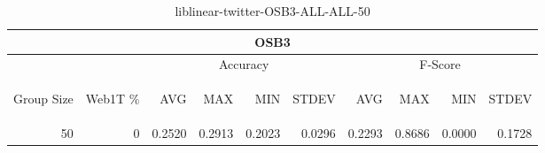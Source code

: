 \begin{center}
\begin{table}[htbp]
\begin{tabular}{ | r | r | r | r | r | r | r | r | r | r |}
\hline
\multicolumn{10}{|c|}{OSB3}\\
\hline
 & & \multicolumn{4}{|c|}{Accuracy} & \multicolumn{4}{|c|}{F-Score}\\ \cline{3-10}
\begin{sideways}Group Size\end{sideways} & \begin{sideways}Web1T \%\end{sideways} & \begin{sideways}AVG\end{sideways} & \begin{sideways}MAX\end{sideways} & \begin{sideways}MIN\end{sideways} & \begin{sideways}STDEV\end{sideways} & \begin{sideways}AVG\end{sideways} & \begin{sideways}MAX\end{sideways} & \begin{sideways}MIN\end{sideways} & \begin{sideways}STDEV\end{sideways}\\
\hline
\multirow{0}{*}{50}
 & 0 & 0.2520 & 0.2913 & 0.2023 & 0.0296 & 0.2293 & 0.8686 & 0.0000 & 0.1728\\ \cline{2-10}
\hline
\end{tabular}
\caption{liblinear-twitter-OSB3-ALL-ALL-50}
\label{table:liblinear-twitter-OSB3-ALL-ALL-50}
\end{table}
\end{center}

